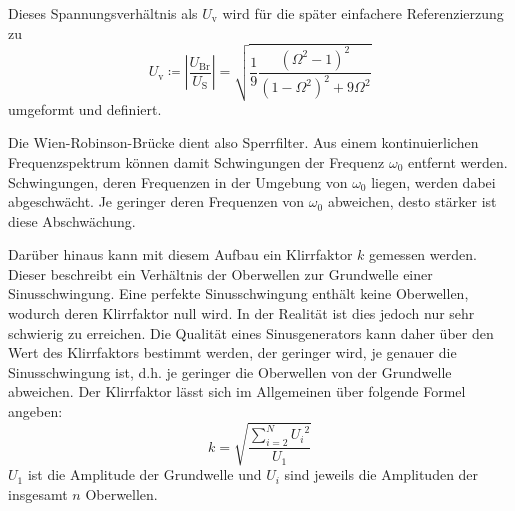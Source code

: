 Dieses Spannungsverhältnis als $U_{\text{v}}$ wird für die später einfachere Referenzierzung zu
\begin{equation}
   U_{\text{v}}\coloneq \left|\frac{U_{\text{Br}}}{U_{\text{S}}}\right| = \sqrt{\frac{1}{9}\frac{(\Omega^2 -1)^2}{(1- \Omega^2)^2 + 9\Omega^2}}
\end{equation}
umgeformt und definiert.


Die Wien-Robinson-Brücke dient also Sperrfilter. Aus einem kontinuierlichen Frequenzspektrum können damit 
Schwingungen der Frequenz $\omega_0$ entfernt werden. Schwingungen, deren Frequenzen in der Umgebung von 
$\omega_0$ liegen, werden dabei abgeschwächt. Je geringer deren Frequenzen von $\omega_0$ abweichen, desto 
stärker ist diese Abschwächung. 

Darüber hinaus kann mit diesem Aufbau ein Klirrfaktor $k$ gemessen werden. Dieser beschreibt ein Verhältnis der 
Oberwellen zur Grundwelle einer Sinusschwingung. Eine perfekte Sinusschwingung enthält keine Oberwellen, wodurch deren 
Klirrfaktor null wird. In der Realität ist dies jedoch nur sehr schwierig zu erreichen. Die Qualität eines Sinusgenerators
kann daher über den Wert des Klirrfaktors bestimmt werden, der geringer wird, je genauer die Sinusschwingung ist, 
d.h. je geringer die Oberwellen von der Grundwelle abweichen. Der Klirrfaktor lässt sich im Allgemeinen über folgende
Formel angeben: \begin{equation}
    \label{eqn:k}
    k = \sqrt{\frac{\sum_{i=2}^N {U_i}^2}{U_1}}
\end{equation}
$U_1$ ist die Amplitude der Grundwelle und $U_i$ sind jeweils die Amplituden der insgesamt $n$ Oberwellen.







